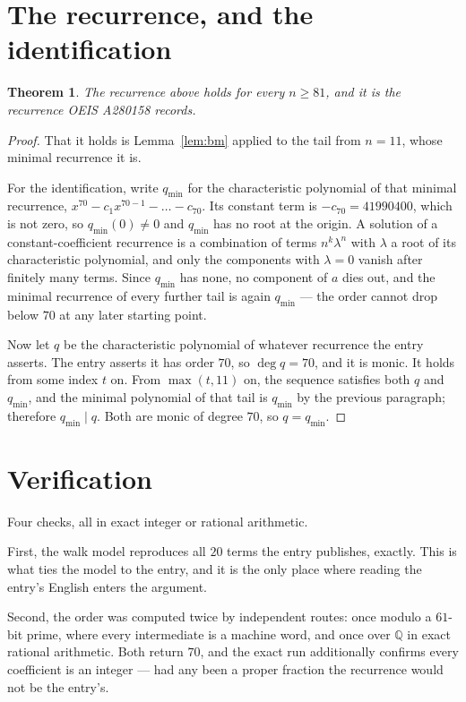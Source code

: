 \documentclass[11pt,a4paper]{article}
\theoremstyle{plain}
\newtheorem{theorem}{Theorem}
\theoremstyle{definition}
\begin{document}
\section{The recurrence, and the identification}

\begin{theorem}
The recurrence above holds for every $n\ge81$, and it is the recurrence OEIS A280158 records.
\end{theorem}

\begin{proof}
That it holds is Lemma~\ref{lem:bm} applied to the tail from $n=11$, whose minimal
recurrence it is.

For the identification, write $q_{\min}$ for the characteristic polynomial of that minimal
recurrence, $x^{70}-c_1x^{70-1}-\dots-c_{70}$. Its constant term is
$-c_{70}=41990400$, which is not zero, so $q_{\min}(0)\neq0$ and $q_{\min}$ has no
root at the origin. A solution of a constant-coefficient recurrence is a combination of terms
$n^{k}\lambda^{n}$ with $\lambda$ a root of its characteristic polynomial, and only the
components with $\lambda=0$ vanish after finitely many terms. Since $q_{\min}$ has none, no
component of $a$ dies out, and the minimal recurrence of every further tail is again
$q_{\min}$ --- the order cannot drop below $70$ at any later starting point.

Now let $q$ be the characteristic polynomial of whatever recurrence the entry asserts. The
entry asserts it has order $70$, so $\deg q=70$, and it is monic. It holds from some
index $t$ on. From $\max(t,11)$ on, the sequence satisfies both $q$ and $q_{\min}$, and
the minimal polynomial of that tail is $q_{\min}$ by the previous paragraph; therefore
$q_{\min}\mid q$. Both are monic of degree $70$, so $q=q_{\min}$.
\end{proof}

\section{Verification}

Four checks, all in exact integer or rational arithmetic.

First, the walk model reproduces all $20$ terms the entry publishes, exactly. This is
what ties the model to the entry, and it is the only place where reading the entry's English
enters the argument.

Second, the order was computed twice by independent routes: once modulo a $61$-bit prime, where
every intermediate is a machine word, and once over $\mathbb{Q}$ in exact rational arithmetic.
Both return $70$, and the exact run additionally confirms every coefficient is an integer
--- had any been a proper fraction the recurrence would not be the entry's.
\end{document}
